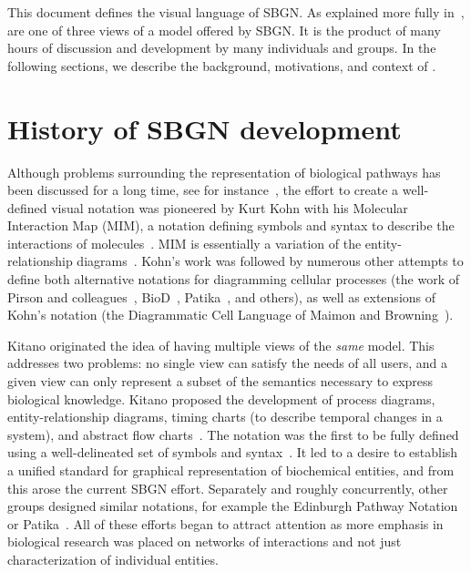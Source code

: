 This document defines the \emph{\PD{}} visual language of SBGN.  As explained more fully in~, \PDs are one of three views of a model offered by SBGN.  It is the product of many hours of discussion and development by many individuals and groups.  In the following sections, we describe the background, motivations, and context of \PDs.


\section{History of SBGN development}
\label{sec:history}

Although problems surrounding the representation of biological pathways has been discussed for a long time, see for instance~\cite{Michal:1998}, the effort to create a well-defined visual notation was pioneered by Kurt Kohn with his Molecular Interaction Map (MIM), a notation defining symbols and syntax to describe the interactions of molecules~\cite{Kohn:1999}.  MIM is essentially a variation of the entity-relationship diagrams~\cite{Chen:1976}. Kohn's work was followed by numerous other attempts to define both alternative notations for diagramming cellular processes (\eg the work of Pirson and colleagues~\cite{Pirson:2000}, BioD~\cite{Cook:2001}, Patika~\cite{Demir:2002,Demir:2004}, and others), as well as extensions of Kohn's notation (\eg the Diagrammatic Cell Language of Maimon and Browning~\cite{Maimon:2001}).

Kitano originated the idea of having multiple views of the \emph{same} model.  This addresses two problems: no single view can satisfy the needs of all users, and a given view can only represent a subset of the semantics necessary to express biological knowledge.  Kitano proposed the development of process diagrams, entity-relationship diagrams, timing charts (to describe temporal changes in a system), and abstract flow charts~\cite{Kitano:2003}.  The \PD notation was the first to be fully defined using a well-delineated set of symbols and syntax~\cite{Kitano:2005}.  It led to a desire to establish a unified standard for graphical representation of biochemical entities, and from this arose the current SBGN effort.  Separately and roughly concurrently, other groups designed similar notations, for example the Edinburgh Pathway Notation~\cite{Moodie:2006} or Patika~\cite{Demir:2002,Demir:2004}.  All of these efforts began to attract attention as more emphasis in biological research was placed on networks of interactions and not just characterization of individual entities.

